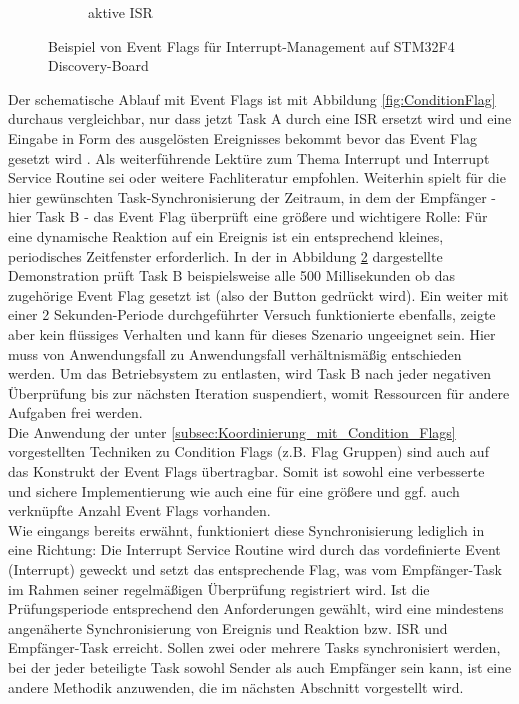 \documentclass{llncs}
\begin{document}
\begin{figure}
\begin{subfigure}{.250\textwidth}
		\caption{aktive ISR}
		\label{fig:EventFlagAn}
	\end{subfigure}
	\caption{Beispiel von Event Flags für Interrupt-Management auf STM32F4 Discovery-Board}
	\label{fig:EventFlagBeispiel}
\end{figure}

Der schematische Ablauf mit Event Flags ist mit Abbildung \ref{fig:ConditionFlag} durchaus vergleichbar, nur dass jetzt Task A durch eine ISR ersetzt wird und eine Eingabe in Form des ausgelösten Ereignisses bekommt bevor das Event Flag gesetzt wird \autocite[vgl.][87]{Cooling2017}. Als weiterführende Lektüre zum Thema Interrupt und Interrupt Service Routine sei \autocite{MikrocontrollerInterrupt} oder weitere Fachliteratur empfohlen. Weiterhin spielt für die hier gewünschten Task-Synchronisierung der Zeitraum, in dem der Empfänger - hier Task B - das Event Flag überprüft eine größere und wichtigere Rolle: Für eine dynamische Reaktion auf ein Ereignis ist ein entsprechend kleines, periodisches Zeitfenster erforderlich. In der in Abbildung \ref{fig:EventFlagBeispiel} dargestellte Demonstration prüft Task B beispielsweise alle 500 Millisekunden ob das zugehörige Event Flag gesetzt ist (also der Button gedrückt wird). Ein weiter mit einer 2 Sekunden-Periode durchgeführter Versuch funktionierte ebenfalls, zeigte aber kein flüssiges Verhalten und kann für dieses Szenario ungeeignet sein. Hier muss von Anwendungsfall zu Anwendungsfall verhältnismäßig entschieden werden. Um das Betriebsystem zu entlasten, wird Task B nach jeder negativen Überprüfung bis zur nächsten Iteration suspendiert, womit Ressourcen für andere Aufgaben frei werden.\\ 

Die Anwendung der unter \ref{subsec:Koordinierung_mit_Condition_Flags} vorgestellten Techniken zu Condition Flags (z.B. Flag Gruppen) sind auch auf das Konstrukt der Event Flags übertragbar. Somit ist sowohl eine verbesserte und sichere Implementierung wie auch eine für eine größere und ggf. auch verknüpfte Anzahl Event Flags vorhanden. \autocite[vgl.][87-88]{Cooling2017}\\

Wie eingangs bereits erwähnt, funktioniert diese Synchronisierung lediglich in eine Richtung: Die Interrupt Service Routine wird durch das vordefinierte Event (Interrupt) geweckt und setzt das entsprechende Flag, was vom Empfänger-Task im Rahmen seiner regelmäßigen Überprüfung registriert wird. Ist die Prüfungsperiode entsprechend den Anforderungen gewählt, wird eine mindestens angenäherte Synchronisierung von Ereignis und Reaktion bzw. ISR und Empfänger-Task erreicht. Sollen zwei oder mehrere Tasks synchronisiert werden, bei der jeder beteiligte Task sowohl Sender als auch Empfänger sein kann, ist eine andere Methodik anzuwenden, die im nächsten Abschnitt vorgestellt wird.
\end{document}
